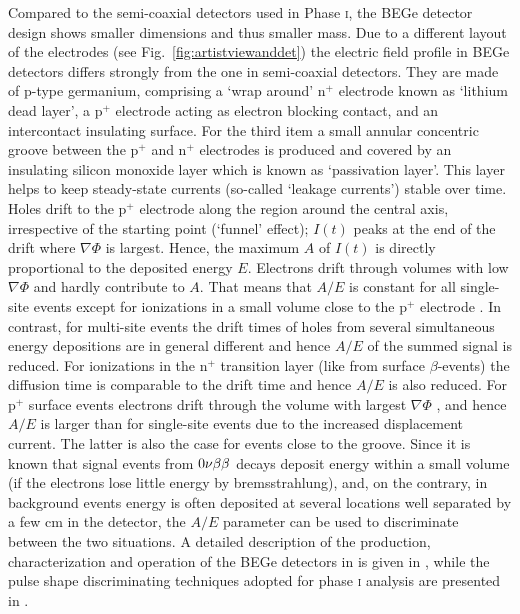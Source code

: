 Compared to the semi-coaxial detectors used in {\gerda} Phase \textsc{i}, the BEGe detector design shows smaller dimensions and thus smaller mass. Due to a different layout of the electrodes (see Fig.~\ref{fig:artistviewanddet}) the electric field profile in BEGe detectors differs strongly from the one in semi-coaxial detectors. They are made of p-type germanium, comprising a `wrap around' n$^+$ electrode known as `lithium dead layer', a p$^+$ electrode acting as electron blocking contact, and an intercontact insulating surface. For the third item a small annular concentric groove between the p$^+$ and n$^+$ electrodes is produced and covered by an insulating silicon monoxide layer which is known as `passivation layer'. This layer helps to keep steady-state currents (so-called `leakage currents') stable over time. Holes drift to the p$^+$ electrode along the region around the central axis, irrespective of the starting point (`funnel' effect); $I(t)$ peaks at the end of the drift where $\nabla\Phi$ is largest. Hence, the maximum $A$ of $I(t)$ is directly proportional to the deposited energy $E$. Electrons drift through volumes with low $\nabla\Phi$ and hardly contribute to $A$. That means that $A/E$ is constant for all single-site events except for ionizations in a small volume close to the p$^+$ electrode \cite{PSD1, PSD2, PSD3}. In contrast, for multi-site events the drift times of holes from several simultaneous energy depositions are in general different and hence $A/E$ of the summed signal is reduced. For ionizations in the n$^+$ transition layer (like from surface $\beta$-events) the diffusion time is comparable to the drift time and hence $A/E$ is also reduced. For p$^+$ surface events electrons drift through the volume with largest $\nabla\Phi$ , and hence $A/E$ is larger than for single-site events due to the increased displacement current. The latter is also the case for events close to the groove. Since it is known that signal events from $0\nu\beta\beta$ decays deposit energy within a small volume (if the electrons lose little energy by bremsstrahlung), and, on the contrary, in background events energy is often deposited at several locations well separated by a few cm in the detector, the $A/E$ parameter can be used to discriminate between the two situations. A detailed description of the production, characterization and operation of the BEGe detectors in {\gerda} is given in \cite{detectors}, while the pulse shape discriminating techniques adopted for phase \textsc{i} analysis are presented in \cite{PSDgerda}.

